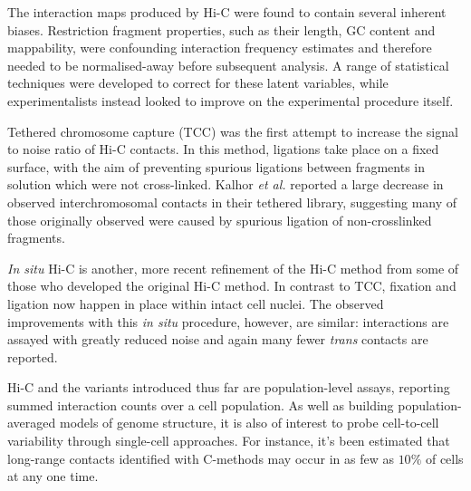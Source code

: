 \documentclass[a4paper,11pt,oneside]{book}
\begin{document}
The interaction maps produced by Hi-C were found to contain several inherent biases. Restriction fragment properties, such as their length, GC content and mappability, were confounding interaction frequency estimates and therefore needed to be normalised-away before subsequent analysis.\cite{Yaffe2011, Hu2013} A range of statistical techniques were developed to correct for these latent variables,\cite{Imakaev2012, Dekker2013, Hu2012, Li2014} while experimentalists instead looked to improve on the experimental procedure itself.

Tethered chromosome capture (TCC)\cite{Kalhor2012} was the first attempt to increase the signal to noise ratio of Hi-C contacts. In this method, ligations take place on a fixed surface, with the aim of preventing spurious ligations between fragments in solution which were not cross-linked. Kalhor \emph{et al.}\cite{Kalhor2012} reported a large decrease in observed interchromosomal contacts in their tethered library, suggesting many of those originally observed were caused by spurious ligation of non-crosslinked fragments.

\emph{In situ} Hi-C is another, more recent refinement of the Hi-C method from some of those who developed the original Hi-C method.\cite{Rao2014} In contrast to TCC, fixation and ligation now happen in place within intact cell nuclei. The observed improvements with this \emph{in situ} procedure, however, are similar: interactions are assayed with greatly reduced noise and again many fewer \emph{trans} contacts are reported.\cite{Nagano2015}

Hi-C and the variants introduced thus far are population-level assays, reporting summed interaction counts over a cell population. As well as building population-averaged models of genome structure, it is also of interest to probe cell-to-cell variability through single-cell approaches. For instance, it's been estimated that long-range contacts identified with C-methods may occur in as few as $10\%$ of cells at any one time.\cite{VanSteensel2010} 
\end{document}
